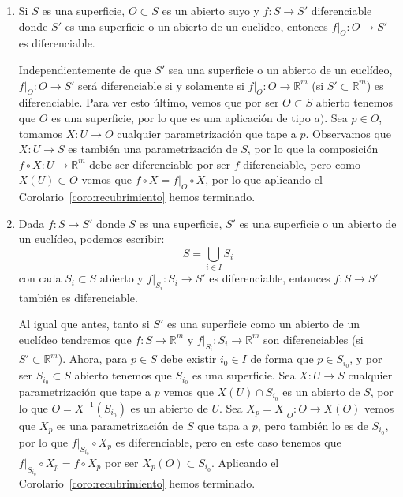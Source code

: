 \begin{ejercicio}
\begin{enumerate}
\begin{itemize}
            \end{itemize}
            Vemos que la misma demsotración nos sirve tanto si $S_3$ es una superficie como si es un abierto de un euclídeo. Vemos además que lo hemos hecho para $S_1$ una superficie. Para $S_1$ un abierto de un euclídeo la demotración es igual pero más simple, pues podemos considerar directamente $f_1$ en lugar de tomar cada vez $f_1\circ X_1$ para $X_1$ una parametrización de $S_1$.
        \item Si $S$ es una superficie, $O\subset S$ es un abierto suyo y $f:S\to S'$ diferenciable donde $S'$ es una superficie o un abierto de un euclídeo, entonces $f\big|_O:O\to S'$ es diferenciable.

            Independientemente de que $S'$ sea una superficie o un abierto de un euclídeo, $f\big|_O:O\to S'$ será diferenciable si y solamente si $f\big|_O:O\to\mathbb{R}^m$ (si $S'\subset\mathbb{R}^m$) es diferenciable. Para ver esto último, vemos que por ser $O\subset S$ abierto tenemos que $O$ es una superficie, por lo que es una aplicación de tipo $a)$. Sea $p\in O$, tomamos $X:U\to O$ cualquier parametrización que tape a $p$. Observamos que $X:U\to S$ es también una parametrización de $S$, por lo que la composición $f\circ X:U\to \mathbb{R}^m$ debe ser diferenciable por ser $f$ diferenciable, pero como $X(U)\subset O$ vemos que $f\circ X = f\big|_O\circ X$, por lo que aplicando el Corolario~\ref{coro:recubrimiento} hemos terminado.
        \item Dada $f:S\to S'$ donde $S$ es una superficie, $S'$ es una superficie o un abierto de un euclídeo, podemos escribir:
            \begin{equation*}
                S=\bigcup_{i \in I}S_i
            \end{equation*}
            con cada $S_i\subset S$ abierto y $f\big|_{S_i}:S_i\to S'$ es diferenciable, entonces $f:S\to S'$ también es diferenciable.

            Al igual que antes, tanto si $S'$ es una superficie como un abierto de un euclídeo tendremos que $f:S\to\mathbb{R}^m$ y $f\big|_{S_i}:S_i\to\mathbb{R}^m$ son diferenciables (si $S'\subset\mathbb{R}^m$). Ahora, para $p\in S$ debe existir $i_0\in I$ de forma que $p\in S_{i_0}$, y por ser $S_{i_0}\subset S$ abierto tenemos que $S_{i_0}$ es una superficie. Sea $X:U\to S$ cualquier parametrización que tape a $p$ vemos que $X(U)\cap S_{i_0}$ es un abierto de $S$, por lo que $O = X^{-1}(S_{i_0})$ es un abierto de $U$. Sea $X_p = X\big|_O:O\to X(O)$ vemos que $X_p$ es una parametrización de $S$ que tapa a $p$, pero también lo es de $S_{i_0}$, por lo que $f\big|_{S_{i_0}}\circ X_p$ es diferenciable, pero en este caso tenemos que $f\big|_{S_{i_0}}\circ X_p = f\circ X_p$ por ser $X_p(O)\subset S_{i_0}$. Aplicando el Corolario~\ref{coro:recubrimiento} hemos terminado.
    \end{enumerate}
\end{ejercicio}~\\

